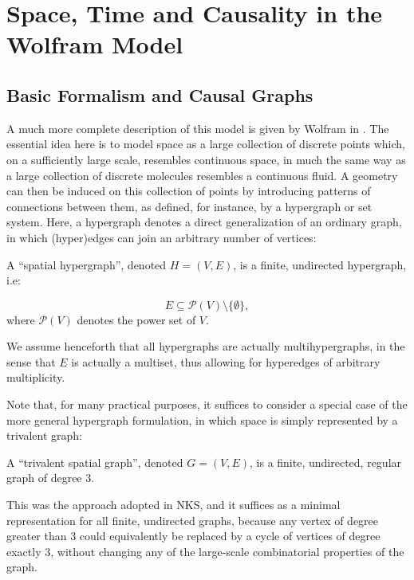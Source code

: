 \documentclass{article}
\begin{document}
\section{Space, Time and Causality in the Wolfram Model}

\subsection{Basic Formalism and Causal Graphs}
\label{sec:CurrentStatus1}

A much more complete description of this model is given by Wolfram in \cite{wolfram_new}. The essential idea here is to model space as a large collection of discrete points which, on a sufficiently large scale, resembles continuous space, in much the same way as a large collection of discrete molecules resembles a continuous fluid. A geometry can then be induced on this collection of points by introducing patterns of connections between them, as defined, for instance, by a hypergraph or set system. Here, a hypergraph denotes a direct generalization of an ordinary graph, in which (hyper)edges can join an arbitrary number of vertices\cite{berge}:

\begin{definition}
A ``spatial hypergraph'', denoted ${H = \left( V, E \right)}$, is a finite, undirected hypergraph, i.e:

\begin{equation}
E \subseteq \mathcal{P} \left( V \right) \setminus \lbrace \emptyset \rbrace,
\end{equation}
where ${\mathcal{P} \left( V \right)}$ denotes the power set of $V$.
\end{definition}
We assume henceforth that all hypergraphs are actually multihypergraphs, in the sense that $E$ is actually a multiset, thus allowing for hyperedges of arbitrary multiplicity.

Note that, for many practical purposes, it suffices to consider a special case of the more general hypergraph formulation, in which space is simply represented by a trivalent graph:

\begin{definition}
A ``trivalent spatial graph'', denoted ${G = \left( V, E \right)}$, is a finite, undirected, regular graph of degree 3.
\end{definition}
This was the approach adopted in NKS, and it suffices as a minimal representation for all finite, undirected graphs, because any vertex of degree greater than 3 could equivalently be replaced by a cycle of vertices of degree exactly 3, without changing any of the large-scale combinatorial properties of the graph.
\end{document}

